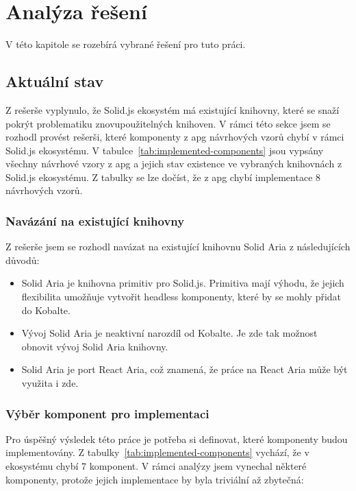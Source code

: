\chapter{Analýza řešení}
\label{chap:analysis}

V této kapitole se rozebírá vybrané řešení pro tuto práci.

\section{Aktuální stav}

Z rešerše vyplynulo, že Solid.js ekosystém má existující knihovny, které se snaží pokrýt problematiku znovupoužitelných knihoven.
V rámci této sekce jsem se rozhodl provést rešerši, které komponenty z \gls{apg} návrhových vzorů chybí v rámci Solid.js ekosystému.
V tabulce~\ref{tab:implemented-components} jsou vypsány všechny návrhové vzory z \gls{apg} a jejich stav existence ve vybraných knihovnách z Solid.js ekosystému.
Z tabulky se lze dočíst, že z \gls{apg} chybí implementace 8 návrhových vzorů.

\subsection{Navázání na existující knihovny}

Z rešerše jsem se rozhodl navázat na existující knihovnu Solid Aria z následujících důvodů:

\begin{itemize}
      \item Solid Aria je knihovna primitiv pro Solid.js. Primitiva mají výhodu, že jejich flexibilita umožňuje vytvořit headless komponenty, které by se mohly přidat do Kobalte.
      \item Vývoj Solid Aria je neaktivní narozdíl od Kobalte. Je zde tak možnost obnovit vývoj Solid Aria knihovny.
      \item Solid Aria je port React Aria, což znamená, že práce na React Aria může být využita i zde.
\end{itemize}

\subsection{Výběr komponent pro implementaci}

Pro úspěšný výsledek této práce je potřeba si definovat, které komponenty budou implementovány.
Z tabulky~\ref{tab:implemented-components} vychází, že v ekosystému chybí 7 komponent.
V rámci analýzy jsem vynechal některé komponenty, protože jejich implementace by byla triviální až zbytečná:

